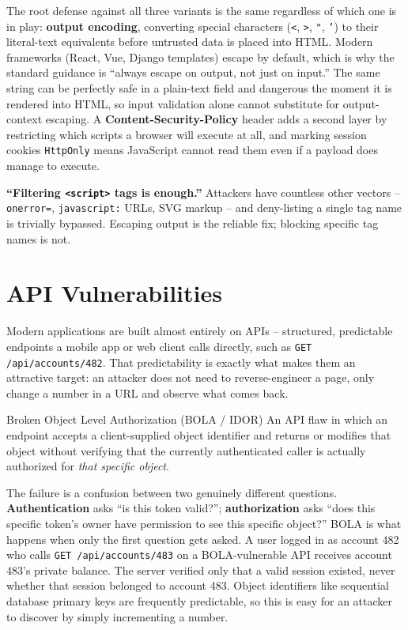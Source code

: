 The root defense against all three variants is the same regardless of which one is in play:
\textbf{output encoding}, converting special characters (\texttt{<}, \texttt{>}, \texttt{"},
\texttt{'}) to their literal-text equivalents before untrusted data is placed into HTML. Modern
frameworks (React, Vue, Django templates) escape by default, which is why the standard guidance is
``always escape on output, not just on input.'' The same string can be perfectly safe in a
plain-text field and dangerous the moment it is rendered into HTML, so input validation alone
cannot substitute for output-context escaping. A \textbf{Content-Security-Policy} header adds a
second layer by restricting which scripts a browser will execute at all, and marking session cookies
\texttt{HttpOnly} means JavaScript cannot read them even if a payload does manage to execute.

\begin{misconception}
\textbf{``Filtering \texttt{<script>} tags is enough.''} Attackers have countless other vectors --
\texttt{onerror=}, \texttt{javascript:} URLs, SVG markup -- and deny-listing a single tag name is
trivially bypassed. Escaping output is the reliable fix; blocking specific tag names is not.
\end{misconception}

\section{API Vulnerabilities}

Modern applications are built almost entirely on APIs -- structured, predictable endpoints a
mobile app or web client calls directly, such as \texttt{GET /api/accounts/482}. That predictability
is exactly what makes them an attractive target: an attacker does not need to reverse-engineer a
page, only change a number in a URL and observe what comes back.

\begin{definition}{Broken Object Level Authorization (BOLA / IDOR)}
An API flaw in which an endpoint accepts a client-supplied object identifier and returns or
modifies that object without verifying that the currently authenticated caller is actually
authorized for \emph{that specific object}.
\end{definition}

The failure is a confusion between two genuinely different questions. \textbf{Authentication} asks
``is this token valid?''; \textbf{authorization} asks ``does this specific token's owner have
permission to see this specific object?'' BOLA is what happens when only the first question gets
asked. A user logged in as account 482 who calls \texttt{GET /api/accounts/483} on a
BOLA-vulnerable API receives account 483's private balance. The server verified only that a valid
session existed, never whether that session belonged to account 483. Object identifiers like
sequential database primary keys are frequently predictable, so this is easy for an attacker to
discover by simply incrementing a number.

